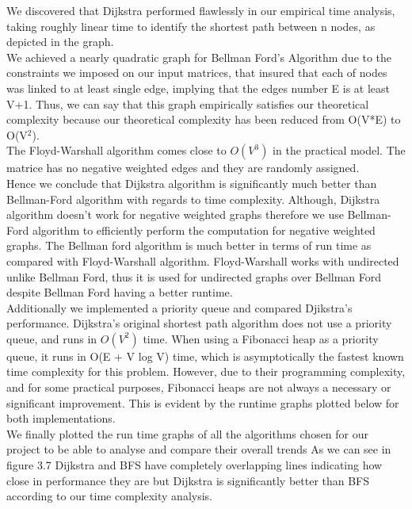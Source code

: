 \documentclass[a4paper, 12pt]{report}
\begin{document}
    We discovered that Dijkstra performed flawlessly in our empirical time analysis, taking roughly linear time to identify the shortest path between n nodes, as depicted in the graph.\\
    
    We achieved a nearly quadratic graph for Bellman Ford's Algorithm due to the constraints we imposed on our input matrices, that insured that each of nodes was linked to at least single edge, implying that the edges number E is at least V+1. Thus, we can say that this graph empirically satisfies our theoretical complexity because our theoretical complexity has been reduced from O(V*E) to O(V$^2$).\\
    
    The Floyd-Warshall algorithm comes close to $O(V^3)$ in the practical model. The matrice has no negative weighted edges and they are randomly assigned.\\
    
    Hence we conclude that Dijkstra algorithm is significantly much better than Bellman-Ford algorithm with regards to time complexity. Although, Dijkstra algorithm doesn't work for negative weighted graphs therefore we use Bellman-Ford algorithm to efficiently perform the computation for negative weighted graphs. The Bellman ford algorithm is much better in terms of run time as compared with Floyd-Warshall algorithm. Floyd-Warshall works with undirected unlike Bellman Ford, thus it is used for undirected graphs over Bellman Ford despite Bellman Ford having a better runtime.\\
    
    Additionally we implemented a priority queue and compared Djikstra's performance. Dijkstra's original shortest path algorithm does not use a priority queue, and runs in $O(V^{2})$ time. When using a Fibonacci heap as a priority queue, it runs in O(E + V log V) time, which is asymptotically the fastest known time complexity for this problem. However, due to their programming complexity, and for some practical purposes, Fibonacci heaps are not always a necessary or significant improvement. This is evident by the runtime graphs plotted below for both implementations.\\
    
    We finally plotted the run time graphs of all the algorithms chosen for our project to be able to analyse and compare their overall trends As we can see in figure 3.7 Dijkstra and BFS have completely overlapping lines indicating how close in performance they are but Dijkstra is significantly better than BFS according to our time complexity analysis. \\
    
\end{document}
